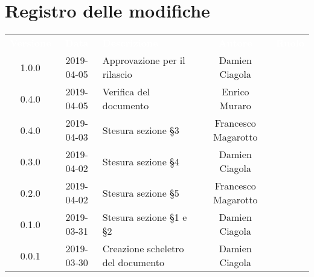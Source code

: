 \section*{Registro delle modifiche}
{
	\renewcommand{\arraystretch}{1.5}
	\centering
	\begin{longtable}{ c c C{6cm} c c }
		\textcolor{white}{\textbf{Versione}} & \textcolor{white}{\textbf{Data}} & \textcolor{white}{\textbf{Descrizione}} & \textcolor{white}{\textbf{Autore}} & \textcolor{white}{\textbf{Ruolo}}\\

		1.0.0 & 
		2019-04-05 &  
		Approvazione per il rilascio &	
		Damien Ciagola &
		\RdP{}  \\	

		0.4.0 & 
		2019-04-05 &  
		Verifica del documento &	
		Enrico Muraro &
		\ver{}  \\			
		
		0.4.0 & 
		2019-04-03 &  
		Stesura sezione §3 &	
		Francesco Magarotto &
		\reda{}  \\			
		
		0.3.0 & 
		2019-04-02 &  
		Stesura sezione §4 &	
		Damien Ciagola &
		\reda{}  \\		
		
		0.2.0 & 
		2019-04-02 &  
		Stesura sezione §5 &	
		Francesco Magarotto &
		\reda{}  \\	
		
		0.1.0 & 
		2019-03-31 &  
		Stesura sezione §1 e §2 &	
		Damien Ciagola &
		\reda{}  \\
		
		0.0.1 & 
		2019-03-30 &  
		Creazione scheletro del documento&	
		Damien Ciagola  &	
		\reda{}  \\
	\end{longtable}

}